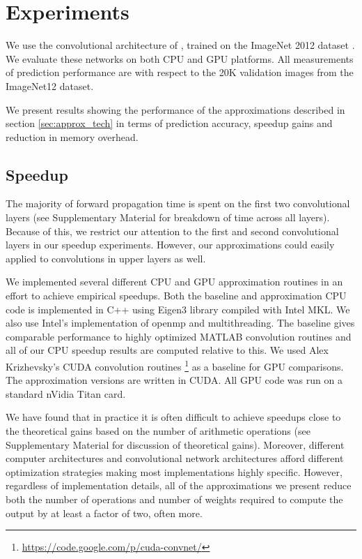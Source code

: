 \section{Experiments}\label{sec:experiments}

We use the convolutional architecture of \cite{zeiler2013visualizing}, trained on the
ImageNet 2012 dataset \cite{imagenet}.
We evaluate these networks on both CPU and GPU platforms. All measurements of prediction performance are with respect to the 20K validation images from the ImageNet12 dataset. 

We present results showing the performance of the approximations described in section \ref{sec:approx_tech} in terms of prediction accuracy, speedup gains and reduction in memory overhead. 

\subsection{Speedup}
The majority of forward propagation time is spent on the first two convolutional layers (see Supplementary Material for breakdown of time across all layers).
Because of this, we restrict our attention to the first and second convolutional layers in our speedup experiments. 
However, our approximations could easily
applied to convolutions in upper layers as well.

We implemented several different CPU and GPU approximation routines 
in an effort to achieve empirical
speedups. Both the baseline and approximation CPU code is implemented
in C++ using Eigen3 library \cite{eigenweb} compiled with Intel MKL.
We also use Intel's implementation of openmp and multithreading. The
baseline gives comparable performance to highly optimized MATLAB
convolution routines and all of our CPU speedup results are computed
relative to this.  We used Alex Krizhevsky's CUDA convolution routines
\footnote{\url{https://code.google.com/p/cuda-convnet/}} as a baseline for GPU
comparisons. The approximation versions are written in CUDA. All GPU
code was run on a standard nVidia Titan card.

We have found that in practice it is often difficult to achieve
speedups close to the theoretical gains based on the number of
arithmetic operations (see Supplementary Material for discussion of theoretical gains).
Moreover, different computer architectures and convolutional network
architectures afford different optimization strategies making most
implementations highly specific.  However, regardless of
implementation details, all of the approximations we present reduce
both the number of operations and number of weights required to
compute the output by at least a factor of two, often more.  

